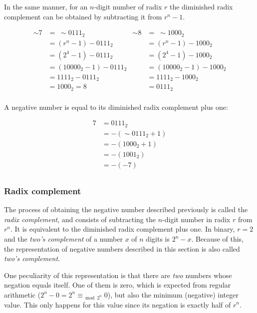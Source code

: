 In the same manner, for an $n$-digit number of radix $r$ the diminished radix
complement can be obtained by subtracting it from $r^n - 1$.

\begin{align*}
    \sim7 &= \;\sim0111_2           & \sim8 &= \;\sim1000_2 \\
          &= (r^n - 1) - 0111_2     &       &= (r^n - 1) - 1000_2 \\
          &= (2^4 - 1) - 0111_2     &       &= (2^4 - 1) - 1000_2 \\
          &= (10000_2 - 1) - 0111_2 &       &= (10000_2 - 1) - 1000_2 \\
          &= 1111_2 - 0111_2        &       &= 1111_2 - 1000_2 \\
          &= 1000_2 = 8             &       &= 0111_2 \\
\end{align*}

A negative number is equal to its diminished radix complement plus one:

\begin{align*}
    7 & = 0111_2 \\
      & = -(\sim0111_2 + 1) \\
      & = -(1000_2 + 1) \\
      & = -(1001_2) \\
      & = -(-7) \\
\end{align*}

\subsubsection{Radix complement}

The process of obtaining the negative number described previously is called
the \textit{radix complement}, and consists of subtracting the $n$-digit number
in radix $r$ from $r^n$.  It is equivalent to the diminished radix complement
plus one.  In binary, $r = 2$ and the \textit{two's complement} of a number $x$
of $n$ digits is $2^n - x$.  Because of this, the representation of negative
numbers described in this section is also called \textit{two's complement}.

One peculiarity of this representation is that there are \emph{two} numbers
whose negation equals itself.  One of them is zero, which is expected from
regular arithmetic ($2^n - 0 = 2^n \equiv_{\bmod{2^n}} 0$), but also the minimum
(negative) integer value.  This only happens for this value since its negation
is exactly half of $r^n$.

